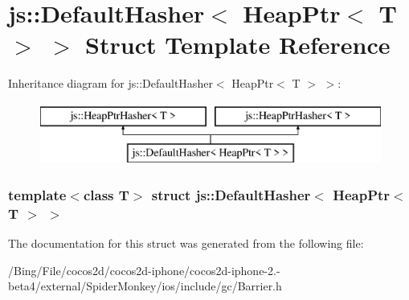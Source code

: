 \hypertarget{structjs_1_1_default_hasher_3_01_heap_ptr_3_01_t_01_4_01_4}{\section{js\-:\-:Default\-Hasher$<$ Heap\-Ptr$<$ T $>$ $>$ Struct Template Reference}
\label{structjs_1_1_default_hasher_3_01_heap_ptr_3_01_t_01_4_01_4}
}
Inheritance diagram for js\-:\-:Default\-Hasher$<$ Heap\-Ptr$<$ T $>$ $>$\-:\begin{figure}[H]
\begin{center}
\leavevmode
\includegraphics[height=2.000000cm]{structjs_1_1_default_hasher_3_01_heap_ptr_3_01_t_01_4_01_4}
\end{center}
\end{figure}
\subsubsection*{template$<$class T$>$ struct js\-::\-Default\-Hasher$<$ Heap\-Ptr$<$ T $>$ $>$}



The documentation for this struct was generated from the following file\-:\begin{DoxyCompactItemize}
\item 
/\-Bing/\-File/cocos2d/cocos2d-\/iphone/cocos2d-\/iphone-\/2.-\/beta4/external/\-Spider\-Monkey/ios/include/gc/Barrier.\-h\end{DoxyCompactItemize}
